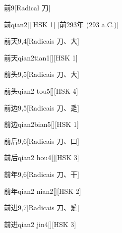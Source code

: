 \begin{entry}{前}{9}[Radical ⼑]
  \begin{phonetics}{前}{qian2}[][HSK 1]
    [前293年  (293 a.C.)]
  \end{phonetics}
\end{entry}

\begin{entry}{前天}{9,4}[Radicais ⼑、⼤]
  \begin{phonetics}{前天}{qian2tian1}[][HSK 1]
  \end{phonetics}
\end{entry}

\begin{entry}{前头}{9,5}[Radicais ⼑、⼤]
  \begin{phonetics}{前头}{qian2 tou5}[][HSK 4]
  \end{phonetics}
\end{entry}

\begin{entry}{前边}{9,5}[Radicais ⼑、⾡]
  \begin{phonetics}{前边}{qian2bian5}[][HSK 1]
  \end{phonetics}
\end{entry}

\begin{entry}{前后}{9,6}[Radicais ⼑、⼝]
  \begin{phonetics}{前后}{qian2 hou4}[][HSK 3]
  \end{phonetics}
\end{entry}

\begin{entry}{前年}{9,6}[Radicais ⼑、⼲]
  \begin{phonetics}{前年}{qian2 nian2}[][HSK 2]
  \end{phonetics}
\end{entry}

\begin{entry}{前进}{9,7}[Radicais ⼑、⾡]
  \begin{phonetics}{前进}{qian2 jin4}[][HSK 3]
  \end{phonetics}
\end{entry}


